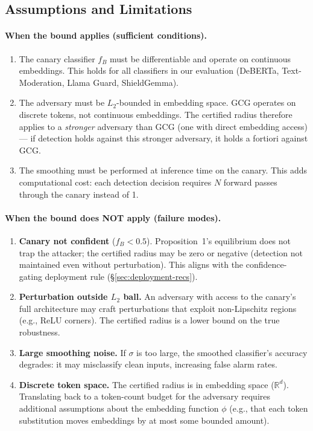 \subsection{Assumptions and Limitations}
\label{sec:smsr-limitations}

\paragraph{When the bound applies (sufficient conditions).}
\begin{enumerate}
\item The canary classifier $f_B$ must be differentiable and operate on continuous embeddings. This holds for all classifiers in our evaluation (DeBERTa, Text-Moderation, Llama Guard, ShieldGemma).
\item The adversary must be $L_2$-bounded in embedding space. GCG operates on discrete tokens, not continuous embeddings. The certified radius therefore applies to a \emph{stronger} adversary than GCG (one with direct embedding access) --- if detection holds against this stronger adversary, it holds a fortiori against GCG.
\item The smoothing must be performed at inference time on the canary. This adds computational cost: each detection decision requires $N$ forward passes through the canary instead of 1.
\end{enumerate}

\paragraph{When the bound does NOT apply (failure modes).}
\begin{enumerate}
\item \textbf{Canary not confident} ($f_B < 0.5$). Proposition~1's equilibrium does not trap the attacker; the certified radius may be zero or negative (detection not maintained even without perturbation). This aligns with the confidence-gating deployment rule (\S\ref{sec:deployment-recs}).
\item \textbf{Perturbation outside $L_2$ ball.} An adversary with access to the canary's full architecture may craft perturbations that exploit non-Lipschitz regions (e.g., ReLU corners). The certified radius is a lower bound on the true robustness.
\item \textbf{Large smoothing noise.} If $\sigma$ is too large, the smoothed classifier's accuracy degrades: it may misclassify clean inputs, increasing false alarm rates.
\item \textbf{Discrete token space.} The certified radius is in embedding space ($\mathbb{R}^d$). Translating back to a token-count budget for the adversary requires additional assumptions about the embedding function $\phi$ (e.g., that each token substitution moves embeddings by at most some bounded amount).
\end{enumerate}

